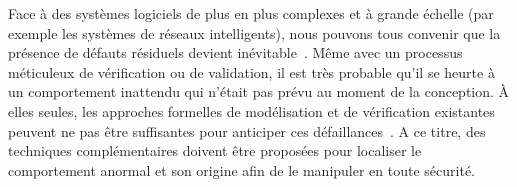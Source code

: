 %
Face à des systèmes logiciels de plus en plus complexes et à grande échelle (par exemple les systèmes de réseaux intelligents), nous pouvons tous convenir que la présence de défauts résiduels devient inévitable~\cite{DBLP:conf/icse/BarbosaLMJ17, DBLP:conf/icse/MongielloPS15, DBLP:conf/icse/HassanBB15}.
Même avec un processus méticuleux de vérification ou de validation, il est très probable qu'il se heurte à un comportement inattendu qui n'était pas prévu au moment de la conception.
À elles seules, les approches formelles de modélisation et de vérification existantes peuvent ne pas être suffisantes pour anticiper ces défaillances~\cite{DBLP:conf/icse/TaharaOH17}.
A ce titre, des techniques complémentaires doivent être proposées pour localiser le comportement anormal et son origine afin de le manipuler en toute sécurité.

